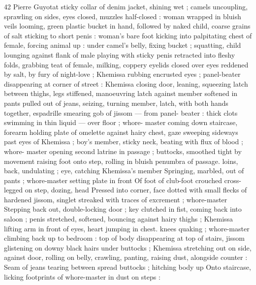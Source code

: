 42 Pierre Guyotat
sticky collar of denim jacket, shining wet ; camels uncoupling,
sprawling on sides, eyes closed, muzzles half-closed : woman
wrapped in bluish veils looming, green plastic bucket in hand,
followed by naked child, coarse grains of salt sticking to short penis
: woman's bare foot kicking into palpitating chest of female, forcing
animal up : under camel's belly, fixing bucket ; squatting, child
lounging against flank of male playing with sticky penis retracted
into fleshy folds, grabbing teat of female, milking, coppery eyelids
closed over eyes reddened by salt, by fury of night-love ; Khemissa
rubbing encrusted eyes ; panel-beater disappearing at corner of
street : Khemissa closing door, leaning, squeezing latch between
thighs, legs stiffened, manoeuvring latch against member softened in
pants pulled out of jeans, seizing, turning member, latch, with both
hands together, espadrille smearing gob of jissom — from panel-
beater : thick clots swimming in thin liquid — over floor ; whore-
master coming down staircase, forearm holding plate of omelette
against hairy chest, gaze sweeping sideways past eyes of Khemissa
; boy’s member, sticky neck, beating with flux of blood ; whore-
master opening second latrine in passage ; buttocks, smoothed tight
by movement raising foot onto step, rolling in bluish penumbra of
passage. loins, back, undulating ; eye, catching Khemissa’s member
Springing, marbled, out of pants ; whore-master setting plate in front
Of foot of club-foot crouched cross-legged on step, dozing, head
Pressed into corner, face dotted with small flecks of hardened
jissom, singlet streaked with traces of excrement ; whore-master
Stepping back out, double-locking door ; key clutched in fist, coming
back into saloon ; penis stretched, softened, bouncing against hairy
thighs ; Khemissa lifting arm in front of eyes, heart jumping in chest.
knees quaking ; whore-master climbing back up to bedroom : top of
body disappearing at top of stairs, jissom glistening on downy black
hairs under buttocks ; Khemissa stretching out on side, against door,
rolling on belly, crawling, panting, raising dust, alongside counter :
Seam of jeans tearing between spread buttocks ; hitching body up
Onto staircase, licking footprints of whore-master in dust on steps :

